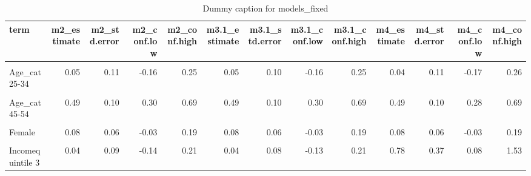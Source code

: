 \begin{table}
\centering
\caption{Dummy caption for models_fixed}
\centering
\fontsize{10}{12}\selectfont
\begin{tabular}[t]{lrrrrrrrrrrrr}
\toprule
term & m2\_estimate & m2\_std.error & m2\_conf.low & m2\_conf.high & m3.1\_estimate & m3.1\_std.error & m3.1\_conf.low & m3.1\_conf.high & m4\_estimate & m4\_std.error & m4\_conf.low & m4\_conf.high\\
\midrule
\cellcolor{gray!10}{(Intercept)} & \cellcolor{gray!10}{-2.54} & \cellcolor{gray!10}{0.51} & \cellcolor{gray!10}{-3.77} & \cellcolor{gray!10}{-1.37} & \cellcolor{gray!10}{-2.65} & \cellcolor{gray!10}{0.34} & \cellcolor{gray!10}{-3.38} & \cellcolor{gray!10}{-1.86} & \cellcolor{gray!10}{-3.18} & \cellcolor{gray!10}{0.45} & \cellcolor{gray!10}{-4.13} & \cellcolor{gray!10}{-2.19}\\
Age\_cat25-34 & 0.05 & 0.11 & -0.16 & 0.25 & 0.05 & 0.10 & -0.16 & 0.25 & 0.04 & 0.11 & -0.17 & 0.26\\
\cellcolor{gray!10}{Age\_cat35-44} & \cellcolor{gray!10}{0.26} & \cellcolor{gray!10}{0.10} & \cellcolor{gray!10}{0.06} & \cellcolor{gray!10}{0.47} & \cellcolor{gray!10}{0.26} & \cellcolor{gray!10}{0.11} & \cellcolor{gray!10}{0.05} & \cellcolor{gray!10}{0.45} & \cellcolor{gray!10}{0.25} & \cellcolor{gray!10}{0.11} & \cellcolor{gray!10}{0.05} & \cellcolor{gray!10}{0.46}\\
Age\_cat45-54 & 0.49 & 0.10 & 0.30 & 0.69 & 0.49 & 0.10 & 0.30 & 0.69 & 0.49 & 0.10 & 0.28 & 0.69\\
\cellcolor{gray!10}{Age\_cat55+} & \cellcolor{gray!10}{0.96} & \cellcolor{gray!10}{0.09} & \cellcolor{gray!10}{0.79} & \cellcolor{gray!10}{1.13} & \cellcolor{gray!10}{0.96} & \cellcolor{gray!10}{0.09} & \cellcolor{gray!10}{0.78} & \cellcolor{gray!10}{1.13} & \cellcolor{gray!10}{0.96} & \cellcolor{gray!10}{0.09} & \cellcolor{gray!10}{0.79} & \cellcolor{gray!10}{1.14}\\
Female & 0.08 & 0.06 & -0.03 & 0.19 & 0.08 & 0.06 & -0.03 & 0.19 & 0.08 & 0.06 & -0.03 & 0.19\\
\cellcolor{gray!10}{Incomequintile 2} & \cellcolor{gray!10}{-0.03} & \cellcolor{gray!10}{0.09} & \cellcolor{gray!10}{-0.21} & \cellcolor{gray!10}{0.15} & \cellcolor{gray!10}{-0.03} & \cellcolor{gray!10}{0.09} & \cellcolor{gray!10}{-0.21} & \cellcolor{gray!10}{0.14} & \cellcolor{gray!10}{0.08} & \cellcolor{gray!10}{0.38} & \cellcolor{gray!10}{-0.70} & \cellcolor{gray!10}{0.83}\\
Incomequintile 3 & 0.04 & 0.09 & -0.14 & 0.21 & 0.04 & 0.08 & -0.13 & 0.21 & 0.78 & 0.37 & 0.08 & 1.53\\

\end{tabular}
\end{table}
